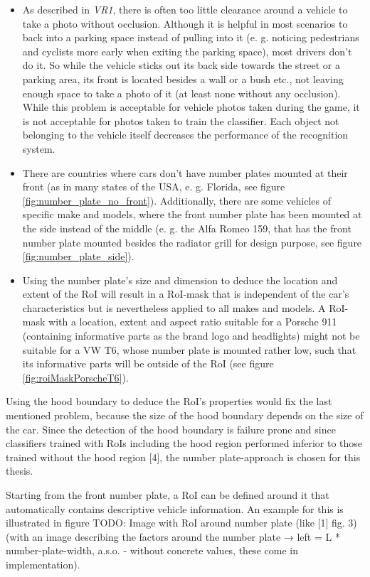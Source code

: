 \begin{itemize}
  \item As described in \emph{VR1}, there is often too little clearance around a vehicle to take a photo without occlusion. Although it is helpful in most scenarios to back into a parking space instead of pulling into it (e. g. noticing pedestrians and cyclists more early when exiting the parking space), most drivers don't do it. So while the vehicle sticks out its back side towards the street or a parking area, its front is located besides a wall or a bush etc., not leaving enough space to take a photo of it (at least none without any occlusion). While this problem is acceptable for vehicle photos taken during the game, it is not acceptable for photos taken to train the classifier. Each object not belonging to the vehicle itself decreases the performance of the recognition system.
  \item There are countries where cars don't have number plates mounted at their front (as in many states of the USA, e. g. Florida, see figure \ref{fig:number_plate_no_front}). Additionally, there are some vehicles of specific make and models, where the front number plate has been mounted at the side instead of the middle (e. g. the Alfa Romeo 159, that has the front number plate mounted besides the radiator grill for design purpose, see figure \ref{fig:number_plate_side}).
  \item Using the number plate's size and dimension to deduce the location and extent of the RoI will result in a RoI-mask that is independent of the car's characteristics but is nevertheless applied to all makes and models. A RoI-mask with a location, extent and aspect ratio suitable for a Porsche 911 (containing informative parts as the brand logo and headlights) might not be suitable for a VW T6, whose number plate is mounted rather low, such that its informative parts will be outside of the RoI (see figure \ref{fig:roiMaskPorscheT6}).
\end{itemize}
Using the hood boundary to deduce the RoI’s properties would fix the last mentioned problem, because the size of the hood boundary depends on the size of the car. Since the detection of the hood boundary is failure prone and since classifiers trained with RoIs including the hood region performed inferior to those trained without the hood region [4], the number plate-approach is chosen for this thesis.

Starting from the front number plate, a RoI can be defined around it that automatically contains descriptive vehicle information. An example for this is illustrated in figure TODO: Image with RoI around number plate (like [1] fig. 3) (with an image describing the factors around the number plate → left = L * number-plate-width, a.s.o. - without concrete values, these come in implementation).

